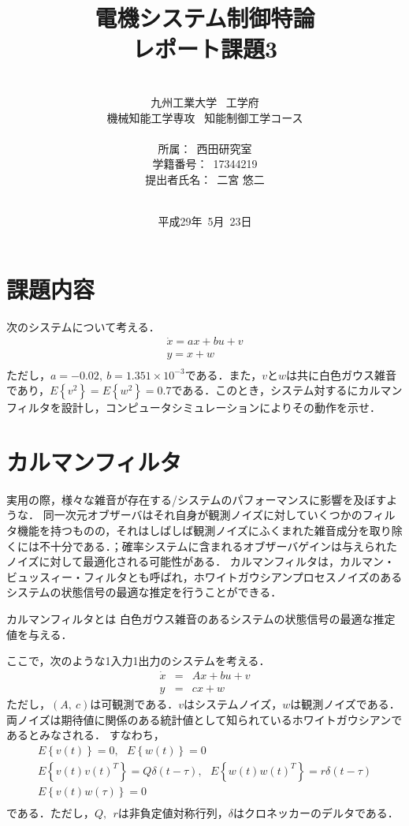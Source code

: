 \documentclass[a4paper,12pt]{jarticle}
\title{\Large{電機システム制御特論\\ レポート課題3}
}
\author{\vspace{70mm}\\
九州工業大学\ \hspace{0mm} 工学府\\
機械知能工学専攻\ \hspace{0mm} 知能制御工学コース\\
\\
所属：\ 西田研究室\\
学籍番号：\ 17344219\\
提出者氏名：\ 二宮 \hspace{0mm} 悠二\\\vspace{5mm}\\}
\date{平成29年\ 5月\ 23日}
\begin{document}
\titlepage
\maketitle
\thispagestyle{empty}
\newpage

\thispagestyle{empty}
\tableofcontents
\newpage

\section{課題内容}
%
次のシステムについて考える．
%
\begin{equation*}
 \begin{array}{c}
  \dot{x} = ax + bu + v \\
  y = x + w \\
 \end{array}
\end{equation*}
%
ただし，$ a = -0.02 , ~ b = 1.351 \times 10^{-3} $である．また，$ v $と$ w $は共に白色ガウス雑音であり，$ E \left\{v^2 \right\} = E \left\{w^2 \right\} = 0.7 $である．このとき，システム対するにカルマンフィルタを設計し，コンピュータシミュレーションによりその動作を示せ．


\section{カルマンフィルタ}
%
実用の際，様々な雑音が存在する/システムのパフォーマンスに影響を及ぼすような．
同一次元オブザーバはそれ自身が観測ノイズに対していくつかのフィルタ機能を持つものの，それはしばしば観測ノイズにふくまれた雑音成分を取り除くには不十分である．；確率システムに含まれるオブザーバゲインは与えられたノイズに対して最適化される可能性がある．
カルマンフィルタは，カルマン・ビュッスィー・フィルタとも呼ばれ，ホワイトガウシアンプロセスノイズのあるシステムの状態信号の最適な推定を行うことができる．



%
カルマンフィルタとは
白色ガウス雑音のあるシステムの状態信号の最適な推定値を与える．


ここで，次のような1入力1出力のシステムを考える．
%
\begin{eqnarray}
 \dot{x} & = & Ax + bu + v \\
 y & = &  cx + w
\end{eqnarray}
%
ただし，$ (A ,~ c) $は可観測である．$ v $はシステムノイズ，$ w $は観測ノイズである．
両ノイズは期待値に関係のある統計値として知られているホワイトガウシアンであるとみなされる．
すなわち，
%
\begin{equation*}
 \begin{array}{c}
  E\left\{v(t)\right\} = 0, ~~~ E\left\{w(t)\right\} = 0 \\
  E\left\{v(t) v(t)^T\right\} = Q \delta(t-\tau), ~~~ E\left\{w(t) w(t)^T\right\} = r \delta(t-\tau) \\
  E\left\{v(t)w(\tau)\right\} = 0 \\
 \end{array}
\end{equation*}
%
である．ただし，$ Q , ~~ r $は非負定値対称行列，$ \delta $はクロネッカーのデルタである．
\end{document}
